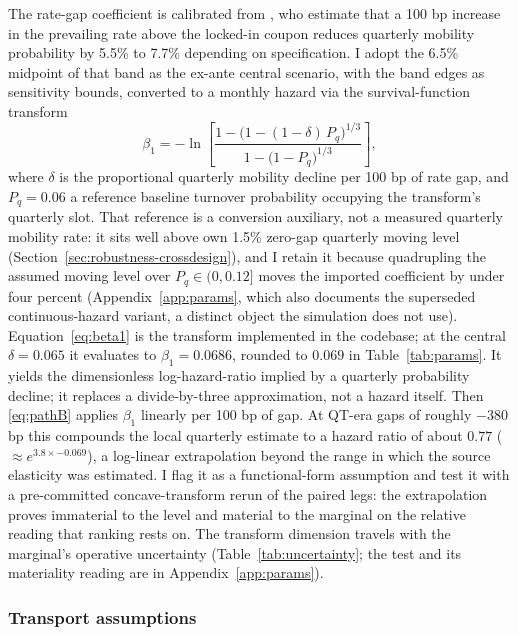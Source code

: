 The rate-gap coefficient is calibrated from \citet{liebersohn2024}, who estimate that a 100 bp increase in the prevailing rate above the locked-in coupon reduces quarterly mobility probability by 5.5\% to 7.7\% depending on specification. I adopt the 6.5\% midpoint of that band as the ex-ante central scenario, with the band edges as sensitivity bounds, converted to a monthly hazard via the survival-function transform
\begin{equation}\label{eq:beta1}
\beta_1 = -\ln\!\left[\frac{1-\big(1-(1-\delta)\,P_q\big)^{1/3}}{1-\big(1-P_q\big)^{1/3}}\right],
\end{equation}
where $\delta$ is the proportional quarterly mobility decline per 100 bp of rate gap, and $P_q = 0.06$ a reference baseline turnover probability occupying the transform's quarterly slot. That reference is a conversion auxiliary, not a measured quarterly mobility rate: it sits well above  own 1.5\% zero-gap quarterly moving level (Section~\ref{sec:robustness-crossdesign}), and I retain it because quadrupling the assumed moving level over $P_q \in (0, 0.12]$ moves the imported coefficient by under four percent (Appendix~\ref{app:params}, which also documents the superseded continuous-hazard variant, a distinct object the simulation does not use). Equation~\eqref{eq:beta1} is the transform implemented in the codebase; at the central $\delta = 0.065$ it evaluates to $\beta_1 = 0.0686$, rounded to $0.069$ in Table~\ref{tab:params}. It yields the dimensionless log-hazard-ratio implied by a quarterly probability decline; it replaces a divide-by-three approximation, not a hazard itself. Then \eqref{eq:pathB} applies $\beta_1$ linearly per 100 bp of gap. At QT-era gaps of roughly $-380$ bp this compounds the local quarterly estimate to a hazard ratio of about $0.77$ ($\approx e^{3.8 \times -0.069}$), a log-linear extrapolation beyond the range in which the source elasticity was estimated. I flag it as a functional-form assumption and test it with a pre-committed concave-transform rerun of the paired legs: the extrapolation proves immaterial to the level and material to the marginal on the relative reading that ranking rests on. The transform dimension travels with the marginal's operative uncertainty (Table~\ref{tab:uncertainty}; the test and its materiality reading are in Appendix~\ref{app:params}).

\subsubsection{Transport assumptions}

